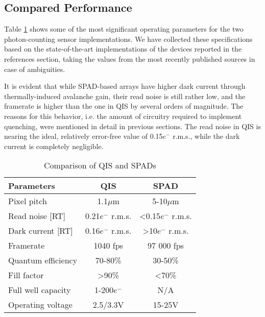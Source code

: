 



\subsection{Compared Performance}

Table \ref{tab:comp} shows some of the most significant operating parameters for the two photon-counting sensor implementations. We have collected these specifications based on the state-of-the-art implementations of the devices reported in the references section, taking the values from the most recently published sources in case of ambiguities.

It is evident that while SPAD-based arrays have higher dark current through thermally-induced avalanche gain, their read noise is still rather low, and the framerate is higher than the one in QIS by several orders of magnitude. The reasons for this behavior, i.e. the amount of circuitry required to implement quenching, were mentioned in detail in previous sections. The read noise in QIS is nearing the ideal, relatively error-free value of 0.15$e^{-}$ r.m.s., while the dark current is completely negligible.

\begin{table}
  \caption{Comparison of QIS and SPADs}
  \label{tab:comp}
  \begin{tabular}{l|cc}
    \toprule
    Parameters & QIS & SPAD\\
    \midrule
    Pixel pitch & 1.1$\mu$m & 5-10$\mu$m\\
    Read noise [RT] & 0.21$e^{-}$ r.m.s. & <0.15$e^{-}$ r.m.s.\\
    Dark current [RT] & 0.16$e^{-}$ r.m.s. & >10$e^{-}$ r.m.s.\\
    Framerate & 1040 fps & 97 000 fps \\
    Quantum efficiency & 70-80\%  & 30-50\% \\
    Fill factor & >90\% & <70\% \\
    Full well capacity & 1-200$e^{-}$ & N/A \\
    Operating voltage & 2.5/3.3V & 15-25V\\
    \bottomrule
  \end{tabular}
\end{table}

